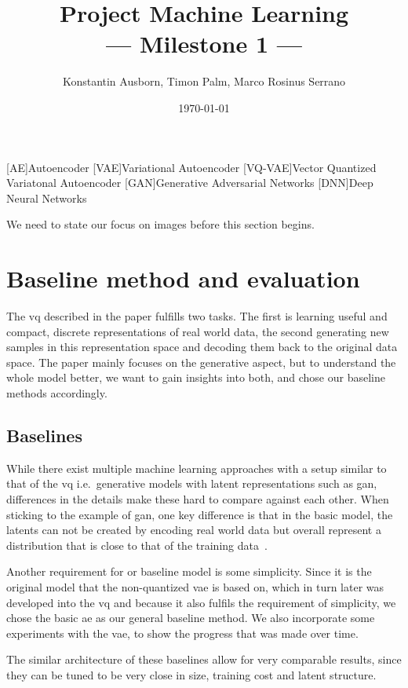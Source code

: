 \documentclass[10pt,a4paper,twoside]{article}
\title{Project Machine Learning\\--- Milestone 1 ---}
\author{Konstantin Ausborn, Timon Palm, Marco Rosinus Serrano}
\date{\today}
\begin{document}
[AE]{Autoencoder}
[VAE]{Variational Autoencoder}
[VQ-VAE]{Vector Quantized Variatonal Autoencoder}
[GAN]{Generative Adversarial Networks}
[DNN]{Deep Neural Networks}

\maketitle

We need to state our focus on images before this section begins.

\section{Baseline method and evaluation}\label{sec:baseline-method-and-evaluation}
The \ac{vq} described in the paper fulfills two tasks.
The first is learning useful and compact, discrete representations of real world data, the second generating new samples
in this representation space and decoding them back to the original data space.
The paper mainly focuses on the generative aspect, but to understand the whole model better, we want to gain insights
into both, and chose our baseline methods accordingly.

\subsection{Baselines}\label{subsec:baselines}
While there exist multiple machine learning approaches with a setup similar to that of the \ac{vq}
i.e.\ generative models with latent representations such as \ac{gan}, differences in the details make these hard to
compare against each other.
When sticking to the example of \ac{gan}, one key difference is that in the basic model, the latents can not be created
by encoding real world data but overall represent a distribution that is close to that of the training data~\cite{gan}.

Another requirement for or baseline model is some simplicity.
Since it is the original model that the non-quantized \ac{vae} is based on, which in turn later was developed into the
\ac{vq} and because it also fulfils the requirement of simplicity, we chose the basic \ac{ae} as our general baseline
method.
We also incorporate some experiments with the \ac{vae}, to show the progress that was made over time.

The similar architecture of these baselines allow for very comparable results, since they can be tuned to be very
close in size, training cost and latent structure.
\end{document}
